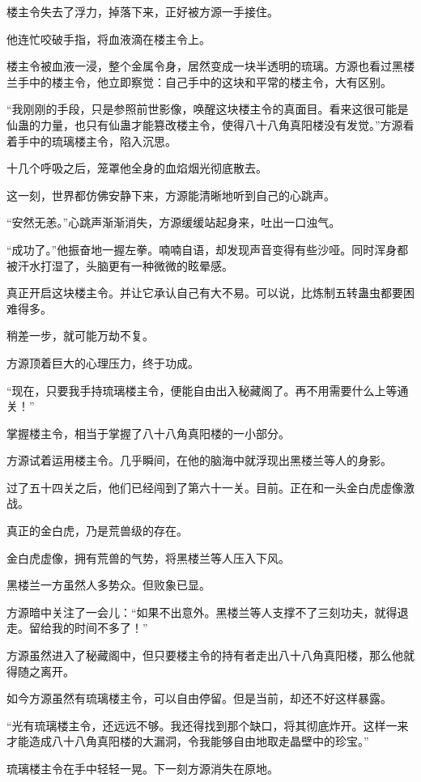 \begin{this_body}
楼主令失去了浮力，掉落下来，正好被方源一手接住。

他连忙咬破手指，将血液滴在楼主令上。

楼主令被血液一浸，整个金属令身，居然变成一块半透明的琉璃。方源也看过黑楼兰手中的楼主令，他立即察觉：自己手中的这块和平常的楼主令，大有区别。

“我刚刚的手段，只是参照前世影像，唤醒这块楼主令的真面目。看来这很可能是仙蛊的力量，也只有仙蛊才能篡改楼主令，使得八十八角真阳楼没有发觉。”方源看着手中的琉璃楼主令，陷入沉思。

十几个呼吸之后，笼罩他全身的血焰烟光彻底散去。

这一刻，世界都仿佛安静下来，方源能清晰地听到自己的心跳声。

“安然无恙。”心跳声渐渐消失，方源缓缓站起身来，吐出一口浊气。

“成功了。”他振奋地一握左拳。喃喃自语，却发现声音变得有些沙哑。同时浑身都被汗水打湿了，头脑更有一种微微的眩晕感。

真正开启这块楼主令。并让它承认自己有大不易。可以说，比炼制五转蛊虫都要困难得多。

稍差一步，就可能万劫不复。

方源顶着巨大的心理压力，终于功成。

“现在，只要我手持琉璃楼主令，便能自由出入秘藏阁了。再不用需要什么上等通关！”

掌握楼主令，相当于掌握了八十八角真阳楼的一小部分。

方源试着运用楼主令。几乎瞬间，在他的脑海中就浮现出黑楼兰等人的身影。

过了五十四关之后，他们已经闯到了第六十一关。目前。正在和一头金白虎虚像激战。

真正的金白虎，乃是荒兽级的存在。

金白虎虚像，拥有荒兽的气势，将黑楼兰等人压入下风。

黑楼兰一方虽然人多势众。但败象已显。

方源暗中关注了一会儿：“如果不出意外。黑楼兰等人支撑不了三刻功夫，就得退走。留给我的时间不多了！”

方源虽然进入了秘藏阁中，但只要楼主令的持有者走出八十八角真阳楼，那么他就得随之离开。

如今方源虽然有琉璃楼主令，可以自由停留。但是当前，却还不好这样暴露。

“光有琉璃楼主令，还远远不够。我还得找到那个缺口，将其彻底炸开。这样一来才能造成八十八角真阳楼的大漏洞，令我能够自由地取走晶壁中的珍宝。”

琉璃楼主令在手中轻轻一晃。下一刻方源消失在原地。


\end{this_body}

